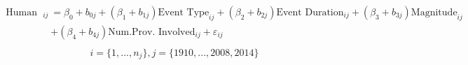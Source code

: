 \begin{align}
\begin{split}
\text{Human Cost}_{ij}&=\beta_0+b_{0j}+(\beta_{1}+b_{1j})\text{Event Type}_{ij}+(\beta_{2}+b_{2j})\text{Event Duration}_{ij}+(\beta_{3}+b_{3j})\text{Magnitude}_{ij}\\ &+(\beta_{4}+b_{4j})\text{Num.Prov. Involved}_{ij}+\varepsilon_{ij}\\
\end{split}
\label{human_time.tex}
\end{align}
\begin{equation*}
i=\{1,...,n_j\},
j=\{1910,...,2008, 2014\}
\end{equation*}
